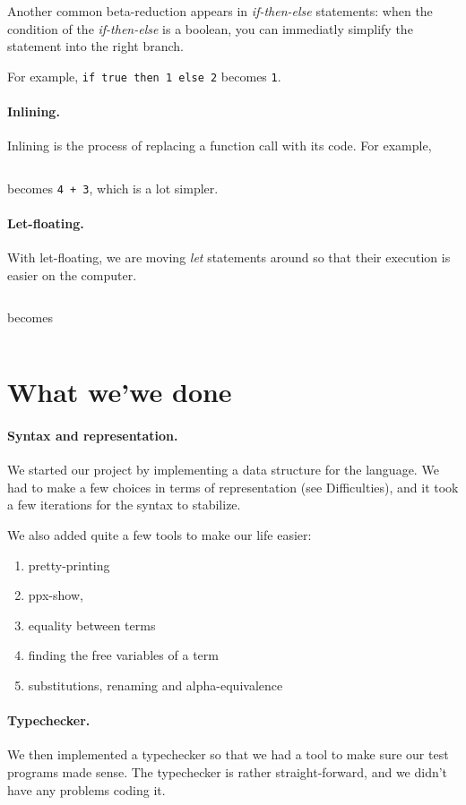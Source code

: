 \documentclass{article}
\begin{document}
Another common beta-reduction appears in {\em if-then-else} statements: when the condition of the
{\em if-then-else} is a boolean, you can immediatly simplify the statement into the right branch.

For example, {\tt if true then 1 else 2} becomes {\tt 1}.


\paragraph{Inlining.}Inlining is the process of replacing a function call with
its code.
For example, 
\inputminted{haskell}{inlining.ml} 
becomes {\tt 4 + 3}, which is a lot simpler.

\paragraph{Let-floating.}With let-floating, we are moving {\em let} statements around
so that their execution is easier on the computer.

\inputminted{haskell}{let-floating.ml}
becomes
\inputminted{haskell}{let-floating2.ml}

\section{What we'we done}

\paragraph{Syntax and representation.}We started our project by implementing a data structure 
for the language. We had to make a few choices in terms of representation (see Difficulties),
and it took a few iterations for the syntax to stabilize.

We also added quite a few tools to make our life easier:
\begin{enumerate}
  \item pretty-printing
  \item ppx-show, 
  \item equality between terms
  \item finding the free variables of a term
  \item substitutions, renaming and alpha-equivalence
\end{enumerate}

\paragraph{Typechecker.}We then implemented a typechecker so that we had a tool to make sure
our test programs made sense. The typechecker is rather straight-forward, and we didn't have any
problems coding it.
\end{document}
